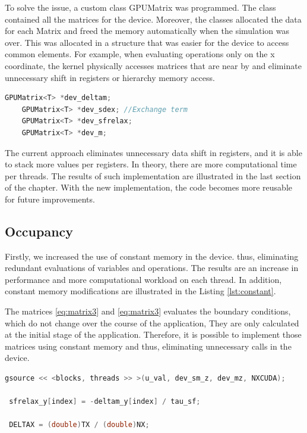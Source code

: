 To solve the issue, a custom class GPUMatrix was programmed. The class contained all the matrices for the device. Moreover, the classes allocated the data for each Matrix and freed the memory automatically when the simulation was over. This was allocated in a structure that was easier for the device to access common elements. For example, when evaluating operations only on the x coordinate, the kernel physically accesses matrices that are near by and eliminate unnecessary shift in registers or hierarchy memory access.

\begin{lstlisting}[language=C++, label={lst:sao}, caption={SOA implementation}]
    GPUMatrix<T> *dev_deltam;
    GPUMatrix<T> *dev_sdex; //Exchange term
    GPUMatrix<T> *dev_sfrelax;
    GPUMatrix<T> *dev_m; 
\end{lstlisting}

The current approach eliminates unnecessary data shift in registers, and it is able to stack more values per registers. In theory, there are more computational time per threads. The results of such implementation are illustrated in the last section of the chapter. With the new implementation, the code becomes more reusable for future improvements. 

\subsection{Occupancy}
 
Firstly, we increased the use of constant memory in the device. thus, eliminating redundant evaluations of variables and operations. The results are an increase in performance and more computational workload on each thread. In addition, constant memory modifications are illustrated in the Listing \ref{lst:constant}. 

The matrices \ref{eq:matrix3} and \ref{eq:matrix3} evaluates the boundary conditions, which do not change over the course of the application, They are only calculated at the initial stage of the application. Therefore, it is possible to implement those matrices using constant memory and  thus, eliminating unnecessary calls in the device.
 
 \begin{lstlisting}[language=C++,  label={lst:constant}, caption={Constant Memory changes}]
 gsource << <blocks, threads >> >(u_val, dev_sm_z, dev_mz, NXCUDA);
 
 sfrelax_y[index] = -deltam_y[index] / tau_sf;
     
 DELTAX = (double)TX / (double)NX;
\end{lstlisting}
 

